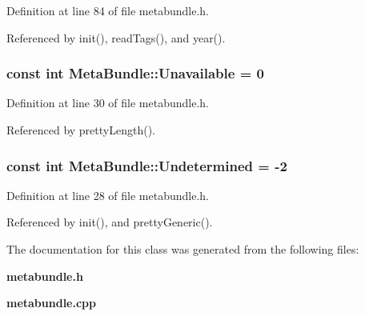 Definition at line 84 of file metabundle.h.

Referenced by init(), read\-Tags(), and year().
\subsubsection{\setlength{\rightskip}{0pt plus 5cm}const int {\bf Meta\-Bundle::Unavailable} = 0\hspace{0.3cm}{\tt  [static]}}\label{classMetaBundle_MetaBundles2}




Definition at line 30 of file metabundle.h.

Referenced by pretty\-Length().
\subsubsection{\setlength{\rightskip}{0pt plus 5cm}const int {\bf Meta\-Bundle::Undetermined} = -2\hspace{0.3cm}{\tt  [static]}}\label{classMetaBundle_MetaBundles0}




Definition at line 28 of file metabundle.h.

Referenced by init(), and pretty\-Generic().

The documentation for this class was generated from the following files:\begin{CompactItemize}
\item 
{\bf metabundle.h}\item 
{\bf metabundle.cpp}\end{CompactItemize}
